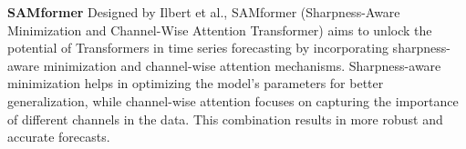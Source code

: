\noindent\textbf
{SAMformer}
 Designed by Ilbert et al.\cite{ilbert2024samformerunlockingpotentialtransformers}, SAMformer (Sharpness-Aware Minimization and Channel-Wise Attention Transformer) aims to unlock the potential of Transformers in time series forecasting by incorporating sharpness-aware minimization and channel-wise attention mechanisms. Sharpness-aware minimization helps in optimizing the model’s parameters for better generalization, while channel-wise attention focuses on capturing the importance of different channels in the data. This combination results in more robust and accurate forecasts.
